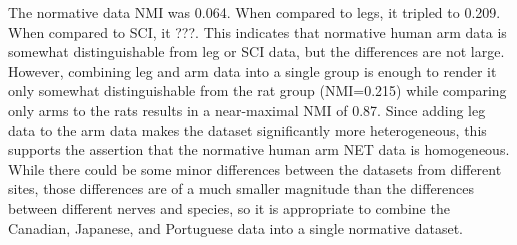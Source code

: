 \documentclass[12pt]{article}
\begin{document}
The normative data NMI was 0.064. When compared to legs, it tripled to 0.209. When compared to SCI, it ???. This indicates that normative human arm data is somewhat distinguishable from leg or SCI data, but the differences are not large. However, combining leg and arm data into a single group is enough to render it only somewhat distinguishable from the rat group (NMI=0.215) while comparing only arms to the rats results in a near-maximal NMI of 0.87. Since adding leg data to the arm data makes the dataset significantly more heterogeneous, this supports the assertion that the normative human arm NET data is homogeneous. While there could be some minor differences between the datasets from different sites, those differences are of a much smaller magnitude than the differences between different nerves and species, so it is appropriate to combine the Canadian, Japanese, and Portuguese data into a single normative dataset.

\end{document}
